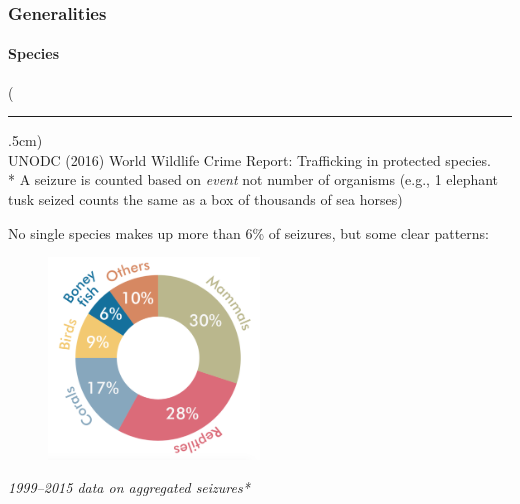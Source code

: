 \documentclass[10pt]{beamer}
\newenvironment{reference}[2]{%
	\begin{textblock*}{\textwidth}(#1,#2)
		\tiny\bgroup\color{gray}}{\egroup\end{textblock*}}
\begin{document}
\begin{frame}[t]
\frametitle{Generalities}
\framesubtitle{Species}
\vspace{0.25cm}

	\begin{reference}{4mm}{88mm}
		\rule{1.5cm}{0.25pt}\\
		UNODC (2016) World Wildlife Crime Report: Trafficking in protected species.\\
		* A seizure is counted based on \emph{event} not number of organisms (e.g., 1 elephant tusk seized counts the same as a box of thousands of sea horses)
	\end{reference}

	No single species makes up more than 6\% of seizures, but some clear patterns:\\
	
	\vspace{0.25cm}
	
	\begin{center}
		\begin{figure}
			\includegraphics[width=0.5\textwidth]{figures/classes.png}\\
		\end{figure}
		\footnotesize{\emph{1999--2015 data on aggregated seizures*}}
	\end{center}
\end{frame}
\end{document}
